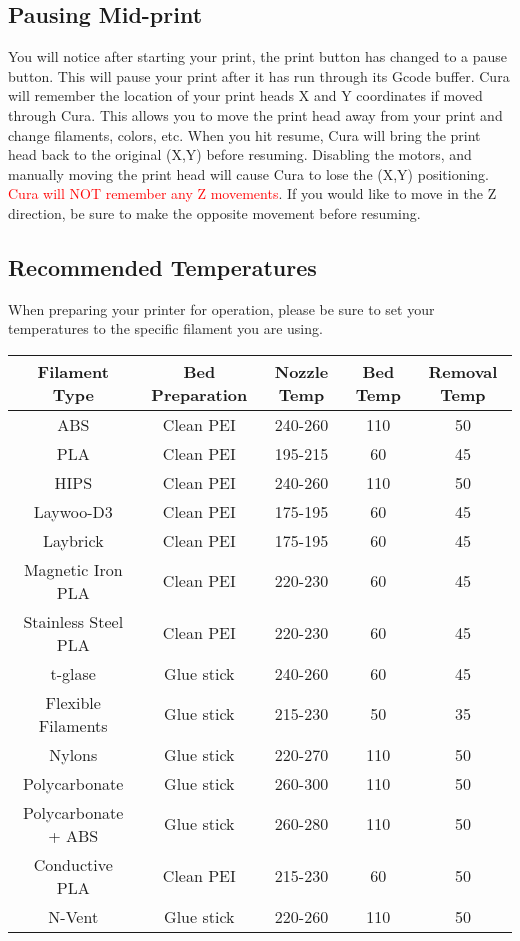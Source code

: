 \subsection{Pausing Mid-print}
You will notice after starting your print, the print button has changed to a pause button. This will pause your print after it has run through its Gcode buffer. Cura will remember the location of your print heads X and Y coordinates if moved through Cura. This allows you to move the print head away from your print and change filaments, colors, etc. When you hit resume, Cura will bring the print head back to the original (X,Y) before resuming. Disabling the motors, and manually moving the print head will cause Cura to lose the (X,Y) positioning. \textcolor{red}{Cura will NOT remember any Z movements}. If you would like to move in the Z direction, be sure to make the opposite movement before resuming.

\subsection{Recommended Temperatures}
When preparing your printer for operation, please be sure to set your temperatures to the specific filament you are using. 
\begin{center}
 \begin{tabular}{||c c c c c||} 
 \hline
 Filament Type & Bed Preparation & Nozzle Temp & Bed Temp & Removal Temp \\ [0.5ex] 
 \hline\hline
 ABS & Clean PEI & 240-260 & 110 & 50 \\ 
 \hline
 PLA & Clean PEI & 195-215 & 60 & 45 \\
 \hline
 HIPS & Clean PEI & 240-260 & 110 & 50\\
 \hline
 Laywoo-D3 & Clean PEI & 175-195 & 60 & 45 \\
 \hline
 Laybrick & Clean PEI & 175-195 & 60 & 45 \\
 \hline 
 Magnetic Iron PLA & Clean PEI & 220-230 & 60 & 45 \\
 \hline
 Stainless Steel PLA & Clean PEI & 220-230 & 60 & 45 \\
 \hline
 t-glase & Glue stick & 240-260 & 60 & 45 \\
 \hline
 Flexible Filaments & Glue stick & 215-230 & 50 & 35 \\  
 \hline
 Nylons & Glue stick & 220-270 & 110 & 50 \\
 \hline
 Polycarbonate & Glue stick & 260-300 & 110 & 50 \\ 
 \hline
 Polycarbonate + ABS & Glue stick & 260-280 & 110 & 50 \\
 \hline 
 Conductive PLA & Clean PEI & 215-230 & 60 & 50 \\
 \hline
 N-Vent & Glue stick & 220-260 & 110 & 50 \\ [1ex]
 \hline
 
\end{tabular}
\end{center}

